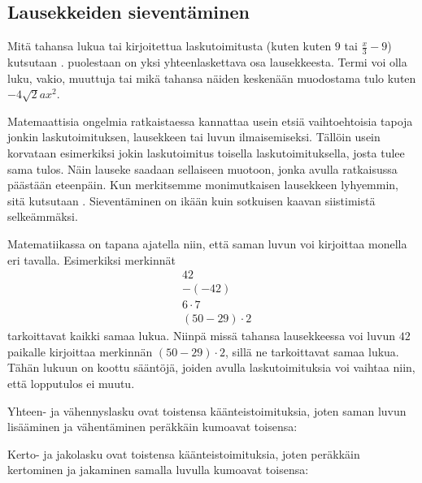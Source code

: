 \subsection*{Lausekkeiden sieventäminen}

Mitä tahansa lukua tai kirjoitettua laskutoimitusta (kuten kuten $9$ tai $\frac{x}{3}-9$) kutsutaan .  puolestaan on yksi yhteenlaskettava osa lausekkeesta. Termi voi olla luku, vakio, muuttuja tai mikä tahansa näiden keskenään muodostama tulo kuten $-4\sqrt{2}ax^2$.

Matemaattisia ongelmia ratkaistaessa kannattaa usein etsiä vaihtoehtoisia tapoja jonkin laskutoimituksen, lausekkeen tai luvun ilmaisemiseksi. Tällöin usein korvataan esimerkiksi jokin laskutoimitus toisella laskutoimituksella, josta tulee sama tulos. Näin lauseke saadaan sellaiseen muotoon, jonka avulla ratkaisussa päästään eteenpäin. Kun merkitsemme monimutkaisen lausekkeen lyhyemmin, sitä kutsutaan . Sieventäminen on ikään kuin sotkuisen kaavan siistimistä selkeämmäksi.

Matematiikassa on tapana ajatella niin, että saman luvun voi kirjoittaa monella eri tavalla. Esimerkiksi merkinnät \begin{align*}
                & 42 \\ & -(-42) \\ & 6 \cdot 7 \\ & (50-29) \cdot 2                                                                                                      
                                                                                                                 \end{align*}
tarkoittavat kaikki samaa lukua. Niinpä missä tahansa lausekkeessa voi luvun $42$ paikalle kirjoittaa merkinnän $(50-29)\cdot 2$, sillä ne tarkoittavat samaa lukua. Tähän lukuun on koottu sääntöjä, joiden avulla laskutoimituksia voi vaihtaa niin, että lopputulos ei muutu.

Yhteen- ja vähennyslasku ovat toistensa käänteistoimituksia, joten saman luvun lisääminen ja vähentäminen peräkkäin kumoavat toisensa:


Kerto- ja jakolasku ovat toistensa käänteistoimituksia, joten peräkkäin kertominen ja jakaminen samalla luvulla kumoavat toisensa:

